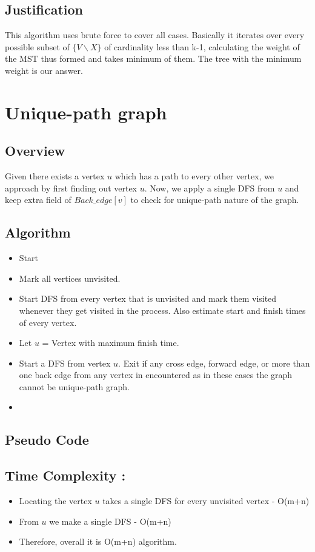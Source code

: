\documentclass{article}
\begin{document}
\subsection{Justification}
This algorithm uses brute force to cover all cases. Basically it iterates over every possible subset of $\{V\backslash X\}$ of cardinality less than k-1, calculating the weight of the MST thus formed and takes minimum of them. The tree with the minimum weight is our answer.\\  

\newpage
\section{Unique-path graph}
\subsection{Overview}
Given there exists a vertex $u$ which has a path to every other vertex, we approach by first finding out vertex $u$. Now, we apply a single DFS from $u$ and keep extra field of $Back\_edge[v]$ to check for unique-path nature of the graph.
\subsection{Algorithm}
\begin{itemize}
\item Start
\item Mark all vertices unvisited. 
\item Start DFS from every vertex that is unvisited and mark them visited whenever they get visited in the process. Also estimate start and finish times of every vertex.
\item Let $u$ = Vertex with maximum finish time.
\item Start a DFS from vertex $u$. Exit if any cross edge, forward edge, or more than one back edge from any vertex in encountered as in these cases the graph cannot be unique-path graph.
\item  
\end{itemize}
\subsection{Pseudo Code}


\subsection{Time Complexity : }
\begin{itemize}
\item Locating the vertex $u$ takes a single DFS for every unvisited vertex - O(m+n)
\item From $u$ we make a single DFS - O(m+n)
\item Therefore, overall it is O(m+n) algorithm.
\end{itemize}
\end{document}
